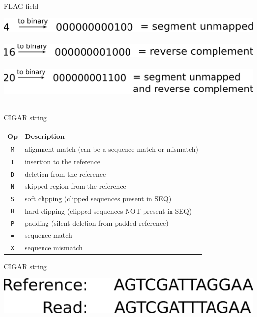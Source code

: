 \documentclass{beamer}
\begin{document}
\begin{frame}{FLAG field}
  \begin{center}
    \includegraphics[width=\linewidth, keepaspectratio]{pic/f1.png}\\~\\
    \pause
    \includegraphics[width=\linewidth, keepaspectratio]{pic/f2.png}\\~\\
    \pause
    \includegraphics[width=\linewidth, keepaspectratio]{pic/f3.png}\\~\\
  \end{center}
\end{frame}

\begin{frame}{CIGAR string}
  \begin{tabular}{cl}
  \hline
  Op & Description\\
  \hline
  {\tt M} & alignment match (can be a sequence match or mismatch)\\
  {\tt I} & insertion to the reference \\
  {\tt D} & deletion from the reference \\
  {\tt N} & skipped region from the reference \\
  {\tt S} & soft clipping (clipped sequences present in {\sf SEQ})\\
  {\tt H} & hard clipping (clipped sequences NOT present in {\sf SEQ})\\
  {\tt P} & padding (silent deletion from padded reference)\\
  {\tt =} & sequence match \\
  {\tt X} & sequence mismatch \\
  \hline
  \end{tabular}
\end{frame}

\begin{frame}{CIGAR string}
  \begin{center}
    \includegraphics[width=\linewidth, keepaspectratio]{pic/c1.png}
  \end{center}
\end{frame}
\end{document}
